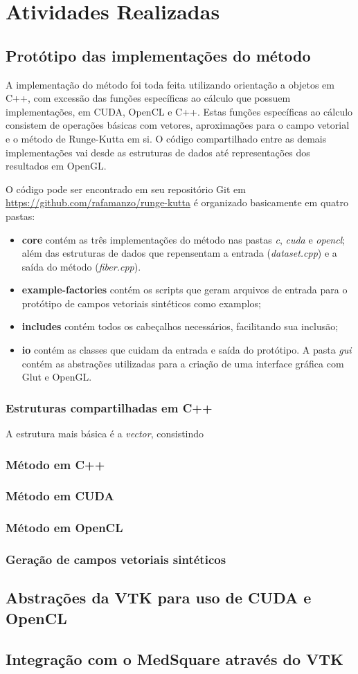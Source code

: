 \chapter{Atividades Realizadas}

\section{Protótipo das implementações do método}
A implementação do método foi toda feita utilizando orientação a objetos em C++, com excessão das funções específicas ao cálculo que possuem implementações, em CUDA, OpenCL e C++. Estas funções específicas ao cálculo consistem de operações básicas com vetores, aproximações para o campo vetorial e o método de Runge-Kutta em si. O código compartilhado entre as demais implementações vai desde as estruturas de dados até representações dos resultados em OpenGL.

O código pode ser encontrado em seu repositório Git em \newline\href{https://github.com/rafamanzo/runge-kutta}{https://github.com/rafamanzo/runge-kutta} é organizado basicamente em quatro pastas:
\begin{itemize}
  \item \textbf{core} contém as três implementações do método nas pastas \textit{c}, \textit{cuda} e \textit{opencl}; além das estruturas de dados que repensentam a entrada (\textit{dataset.cpp}) e a saída do método (\textit{fiber.cpp}).
  \item \textbf{example-factories} contém os scripts que geram arquivos de entrada para o protótipo de campos vetoriais sintéticos como examplos;
  \item \textbf{includes} contém todos os cabeçalhos necessários, facilitando sua inclusão;
  \item \textbf{io} contém as classes que cuidam da entrada e saída do protótipo. A pasta \textit{gui} contém as abstrações utilizadas para a criação de uma interface gráfica com Glut e OpenGL. 
\end{itemize}

  \subsection{Estruturas compartilhadas em C++}
  A estrutura mais básica é a \textit{vector}, consistindo
  
  \subsection{Método em C++}
  \subsection{Método em CUDA}
  \subsection{Método em OpenCL}
  \subsection{Geração de campos vetoriais sintéticos}
\section{Abstrações da VTK para uso de CUDA e OpenCL}
\section{Integração com o MedSquare através do VTK}
